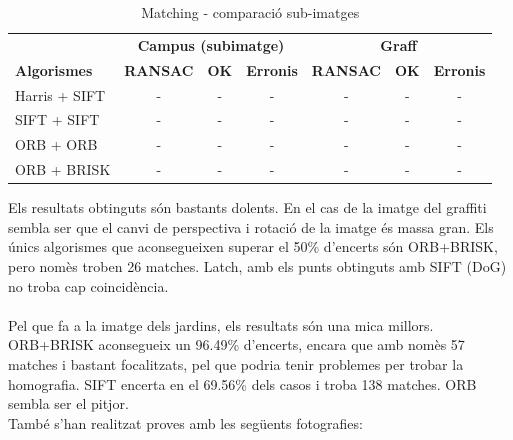 		\begin{table}[H]
			\begin{center}
				\begin{tabular}{l | c c c | c c c}
					& \multicolumn{3}{c|}{\textbf{Campus (subimatge)}} & \multicolumn{3}{c}{\textbf{Graff}} \\
					\textbf{Algorismes} & \textbf{RANSAC} & \textbf{OK} & \textbf{Erronis} & \textbf{RANSAC} & \textbf{OK} & \textbf{Erronis} \\ \hline
					Harris + SIFT & - & - & - & - & - & - \\
					SIFT + SIFT & - & - & - & - & - & - \\
					ORB + ORB & - & - & - & - & - & - \\
					ORB + BRISK & - & - & - & - & - & - \\
				\end{tabular}
			\end{center}
			\caption{Matching - comparació sub-imatges}
		\end{table}
		\noindent
		Els resultats obtinguts són bastants dolents. En el cas de la imatge del graffiti sembla ser que el canvi de perspectiva i rotació de la imatge és massa gran.
		Els únics algorismes que aconsegueixen superar el 50\% d'encerts són ORB+BRISK, pero nomès troben 26 matches. Latch, amb els punts obtinguts amb SIFT (DoG) no troba cap coincidència.\\\\
		Pel que fa a la imatge dels jardins, els resultats són una mica millors. ORB+BRISK aconsegueix un 96.49\% d'encerts, encara que amb nomès 57 matches i bastant focalitzats, pel que podria tenir
		problemes per trobar la homografia. SIFT encerta en el 69.56\% dels casos i troba 138 matches. ORB sembla ser el pitjor.\\

		\noindent
		També s'han realitzat proves amb les següents fotografies:

